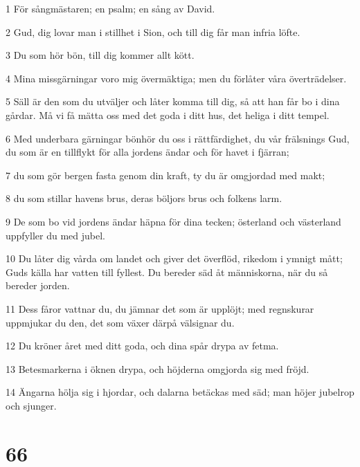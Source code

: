 \par 1 För sångmästaren; en psalm; en sång av David.
\par 2 Gud, dig lovar man i stillhet i Sion, och till dig får man infria löfte.
\par 3 Du som hör bön, till dig kommer allt kött.
\par 4 Mina missgärningar voro mig övermäktiga; men du förlåter våra överträdelser.
\par 5 Säll är den som du utväljer och låter komma till dig, så att han får bo i dina gårdar. Må vi få mätta oss med det goda i ditt hus, det heliga i ditt tempel.
\par 6 Med underbara gärningar bönhör du oss i rättfärdighet, du vår frälsnings Gud, du som är en tillflykt för alla jordens ändar och för havet i fjärran;
\par 7 du som gör bergen fasta genom din kraft, ty du är omgjordad med makt;
\par 8 du som stillar havens brus, deras böljors brus och folkens larm.
\par 9 De som bo vid jordens ändar häpna för dina tecken; österland och västerland uppfyller du med jubel.
\par 10 Du låter dig vårda om landet och giver det överflöd, rikedom i ymnigt mått; Guds källa har vatten till fyllest. Du bereder säd åt människorna, när du så bereder jorden.
\par 11 Dess fåror vattnar du, du jämnar det som är upplöjt; med regnskurar uppmjukar du den, det som växer därpå välsignar du.
\par 12 Du kröner året med ditt goda, och dina spår drypa av fetma.
\par 13 Betesmarkerna i öknen drypa, och höjderna omgjorda sig med fröjd.
\par 14 Ängarna hölja sig i hjordar, och dalarna betäckas med säd; man höjer jubelrop och sjunger.

\chapter{66}

